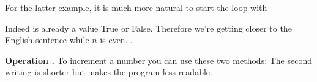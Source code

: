 \documentclass[11pt,class=report,crop=false]{standalone}
\begin{document}
\begin{cours}
\begin{exemple}
For the latter example, it is much more natural to start the loop with

Indeed  is already a value \og{}True\fg{} or \og{}False\fg{}.
Therefore we're getting closer to the English sentence \og{}while $n$ is even...\fg{}

\end{exemple}


\textbf{Operation \og{}\ci{+=}\fg{}.}
To increment a number you can use these two methods:
The second writing is shorter but makes the program less readable.
\end{cours}




\bigskip
\bigskip
\end{document}
